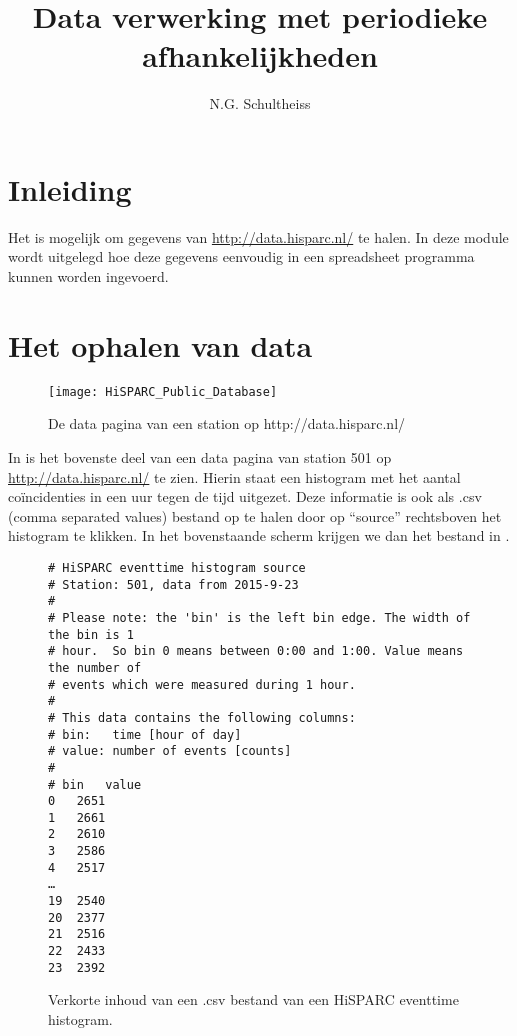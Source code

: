 



\title{Data verwerking met periodieke afhankelijkheden}
\author{N.G. Schultheiss}
\date{}

\maketitle
\thispagestyle{firststyle}

\section{Inleiding}

Het is mogelijk om gegevens van \url{http://data.hisparc.nl/} te halen. In
deze module wordt uitgelegd hoe deze gegevens eenvoudig in een spreadsheet
programma kunnen worden ingevoerd.


\section{Het ophalen van data}

\begin{figure}[h]
    \centering
    \texttt{[image: HiSPARC\_Public\_Database]}
    \caption{\label{fig:datapagina}De data pagina van een station op http://data.hisparc.nl/}
\end{figure}


In  is het bovenste deel van een data pagina van station 501 op
\url{http://data.hisparc.nl/} te zien. Hierin staat een histogram met het
aantal coïncidenties in een uur tegen de tijd uitgezet. Deze informatie
is ook als .csv (comma separated values) bestand op te halen door op
``source'' rechtsboven het histogram te klikken. In het bovenstaande
scherm krijgen we dan het bestand in .

\begin{figure}[h]
\centering
\begin{verbatim}
# HiSPARC eventtime histogram source
# Station: 501, data from 2015-9-23
#
# Please note: the 'bin' is the left bin edge. The width of the bin is 1
# hour.  So bin 0 means between 0:00 and 1:00. Value means the number of
# events which were measured during 1 hour.
#
# This data contains the following columns:
# bin:   time [hour of day]
# value: number of events [counts]
#
# bin	value
0	2651
1	2661
2	2610
3	2586
4	2517
…
19	2540
20	2377
21	2516
22	2433
23	2392
\end{verbatim}
\caption{Verkorte inhoud van een .csv bestand van een HiSPARC eventtime histogram.}
\label{fig:eventtime-source}
\end{figure}


